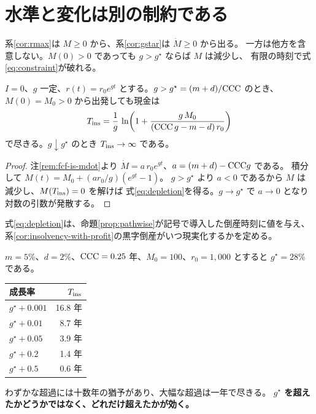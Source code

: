 \section{水準と変化は別の制約である}
\label{sec:level-and-change}

\begin{remark}[水準の制約と変化の制約は独立である]
\label{rem:level-and-change}
系\ref{cor:rmax}は $M\geq 0$ から、系\ref{cor:gstar}は $\dot M\geq 0$ から出る。
一方は他方を含意しない。$M(0)>0$ であっても $g>g^\star$ ならば $M$ は減少し、
有限の時刻で式\eqref{eq:constraint}が破れる。
\end{remark}

\begin{proposition}[現金の枯渇時刻]
\label{prop:depletion}
$I=0$、$g$ 一定、$r(t)=r_0e^{gt}$ とする。$g>g^\star=(m+d)/\mathrm{CCC}$ のとき、
$M(0)=M_0>0$ から出発しても現金は
\begin{equation}
T_{\mathrm{ins}} = \frac{1}{g}\,
\ln\!\left(1+\frac{g\,M_0}{(\mathrm{CCC}\,g-m-d)\,r_0}\right)
\label{eq:depletion}
\end{equation}
で尽きる。$g\downarrow g^\star$ のとき $T_{\mathrm{ins}}\to\infty$ である。
\end{proposition}

\begin{proof}
注\ref{rem:fcf-is-mdot}より $\dot M = a\,r_0e^{gt}$、$a=(m+d)-\mathrm{CCC} g$ である。
積分して $M(t)=M_0+(a r_0/g)(e^{gt}-1)$。
$g>g^\star$ より $a<0$ であるから $M$ は減少し、$M(T_{\mathrm{ins}})=0$ を解けば
式\eqref{eq:depletion}を得る。$g\to g^\star$ で $a\to 0$ となり対数の引数が発散する。
\end{proof}

式\eqref{eq:depletion}は、命題\ref{prop:pathwise}が記号で導入した倒産時刻に値を与え、
系\ref{cor:insolvency-with-profit}の黒字倒産がいつ現実化するかを定める。

\begin{example}
\label{ex:depletion}
$m=5\%$、$d=2\%$、$\mathrm{CCC}=0.25$ 年、$M_0=100$、$r_0=1{,}000$ とすると $g^\star=28\%$ である。
\begin{center}
\begin{tabular}{@{}lr@{}}
\toprule
成長率 & $T_{\mathrm{ins}}$ \\
\midrule
$g^\star+0.001$ & 16.8 年 \\
$g^\star+0.01$ & 8.7 年 \\
$g^\star+0.05$ & 3.9 年 \\
$g^\star+0.2$ & 1.4 年 \\
$g^\star+0.5$ & 0.6 年 \\
\bottomrule
\end{tabular}
\label{tab:depletion}
\end{center}
わずかな超過には十数年の猶予があり、大幅な超過は一年で尽きる。
\textbf{$g^\star$ を超えたかどうかではなく、どれだけ超えたかが効く。}
\end{example}

